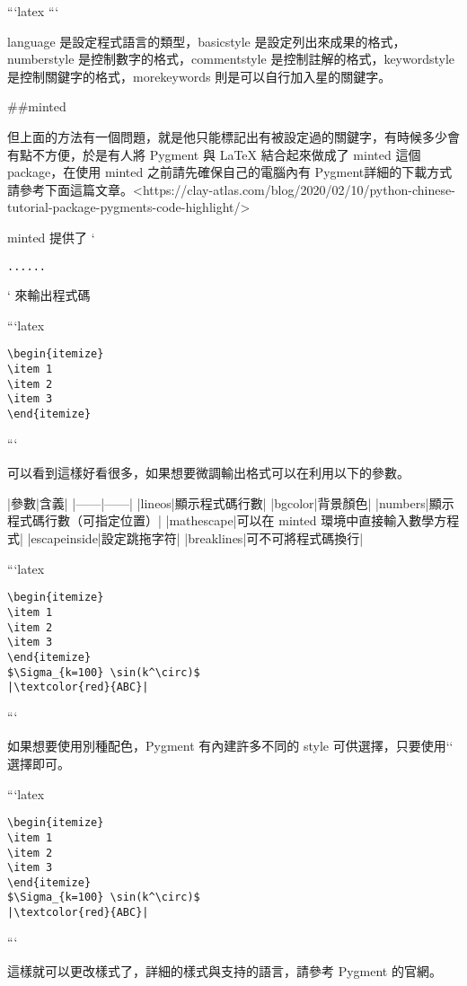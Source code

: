 \begin{markdown}
```latex
```

language 是設定程式語言的類型，basicstyle 是設定列出來成果的格式，numberstyle 是控制數字的格式，commentstyle 是控制註解的格式，keywordstyle 是控制關鍵字的格式，morekeywords 則是可以自行加入星的關鍵字。

##minted

但上面的方法有一個問題，就是他只能標記出有被設定過的關鍵字，有時候多少會有點不方便，於是有人將 Pygment 與 LaTeX 結合起來做成了 minted 這個 package，在使用 minted 之前請先確保自己的電腦內有 Pygment詳細的下載方式請參考下面這篇文章。<https://clay-atlas.com/blog/2020/02/10/python-chinese-tutorial-package-pygments-code-highlight/>

minted 提供了 `\begin{verbatim}......\end{verbatim}` 來輸出程式碼

```latex
\begin{verbatim}
\begin{itemize}
\item 1
\item 2
\item 3
\end{itemize}
\end{verbatim}
```

可以看到這樣好看很多，如果想要微調輸出格式可以在利用以下的參數。

|參數|含義|
|------|------|
|lineos|顯示程式碼行數|
|bgcolor|背景顏色|
|numbers|顯示程式碼行數（可指定位置）|
|mathescape|可以在 minted 環境中直接輸入數學方程式|
|escapeinside|設定跳拖字符|
|breaklines|可不可將程式碼換行|

```latex
\begin{verbatim}
\begin{itemize}
\item 1
\item 2
\item 3
\end{itemize}
$\Sigma_{k=100} \sin(k^\circ)$
|\textcolor{red}{ABC}|
\end{verbatim}
```

如果想要使用別種配色，Pygment 有內建許多不同的 style 可供選擇，只要使用`` 選擇即可。

```latex
\begin{verbatim}
\begin{itemize}
\item 1
\item 2
\item 3
\end{itemize}
$\Sigma_{k=100} \sin(k^\circ)$
|\textcolor{red}{ABC}|
\end{verbatim}
```

這樣就可以更改樣式了，詳細的樣式與支持的語言，請參考 Pygment 的官網。

\end{markdown}